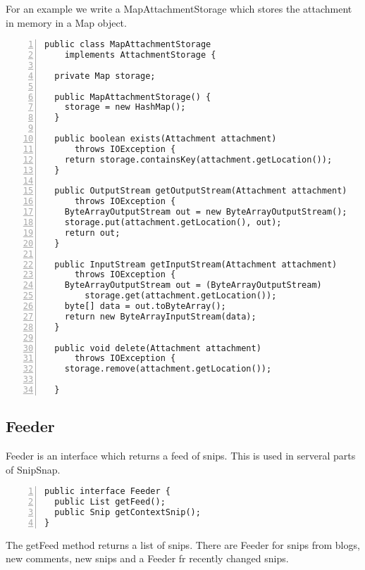\documentclass[a4paper,pdftex]{article}
\begin{document}
For an example we write a MapAttachmentStorage which stores the attachment in memory in a Map object.

\begin{Verbatim}[gobble=0,frame=single,numbers=left,fontsize=\small]
public class MapAttachmentStorage
    implements AttachmentStorage {

  private Map storage;

  public MapAttachmentStorage() {
    storage = new HashMap();
  }

  public boolean exists(Attachment attachment)
      throws IOException {
    return storage.containsKey(attachment.getLocation());
  }

  public OutputStream getOutputStream(Attachment attachment)
      throws IOException {
    ByteArrayOutputStream out = new ByteArrayOutputStream();
    storage.put(attachment.getLocation(), out);
    return out;
  }

  public InputStream getInputStream(Attachment attachment)
      throws IOException {
    ByteArrayOutputStream out = (ByteArrayOutputStream)
        storage.get(attachment.getLocation());
    byte[] data = out.toByteArray();
    return new ByteArrayInputStream(data);
  }

  public void delete(Attachment attachment)
      throws IOException {
    storage.remove(attachment.getLocation());

  }
\end{Verbatim}


\subsection{Feeder}

Feeder is an interface which returns a feed of snips. This is used in serveral parts of SnipSnap.

\begin{Verbatim}[gobble=0,frame=single,numbers=left,fontsize=\small]
public interface Feeder {
  public List getFeed();
  public Snip getContextSnip();
}
\end{Verbatim}

The getFeed method returns a list of snips. There are Feeder for snips from blogs, new comments, new snips and
a Feeder fr recently changed snips.
\end{document}
